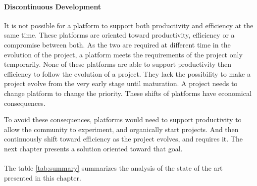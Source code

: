 
\paragraph{Discontinuous Development}

It is not possible for a platform to support both productivity and efficiency at the same time.
These platforms are oriented toward productivity, efficiency or a compromise between both.
As the two are required at different time in the evolution of the project, a platform meets the requirements of the project only temporarily.
None of these platforms are able to support productivity then efficiency to follow the evolution of a project.
They lack the possibility to make a project evolve from the very early stage until maturation. 
A project needs to change platform to change the priority.
These shifts of platforms have economical consequences.

To avoid these consequences, platforms would need to support productivity to allow the community to experiment, and organically start projects.
And then continuously shift toward efficiency as the project evolves, and requires it.
The next chapter presents a solution oriented toward that goal. 

\paragraph{}

The table \ref{tab:summary} summarizes the analysis of the state of the art presented in this chapter.


                                    \endinput


Some links I NEED to put :
--------------------------

https://glyph.twistedmatrix.com/2014/02/unyielding.html
http://calculist.org/blog/2011/12/14/why-coroutines-wont-work-on-the-web/

Transitions :
  - Linkedin - http://engineering.linkedin.com/architecture/brief-history-scaling-linkedin
  - Facebook - https://www.cs.princeton.edu/events/event/evolution-software-architecture-facebook / http://www.infoq.com/presentations/Evolution-of-Code-Design-at-Facebook
  - ... 

